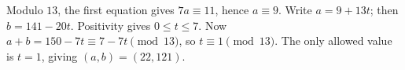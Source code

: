 Modulo $13$, the first equation gives $7a\equiv11$, hence $a\equiv9$. Write $a=9+13t$; then $b=141-20t$. Positivity gives $0\le t\le7$. Now $a+b=150-7t\equiv7-7t\pmod{13}$, so $t\equiv1\pmod{13}$. The only allowed value is $t=1$, giving $\boxed{(a,b)=(22,121)}$.
